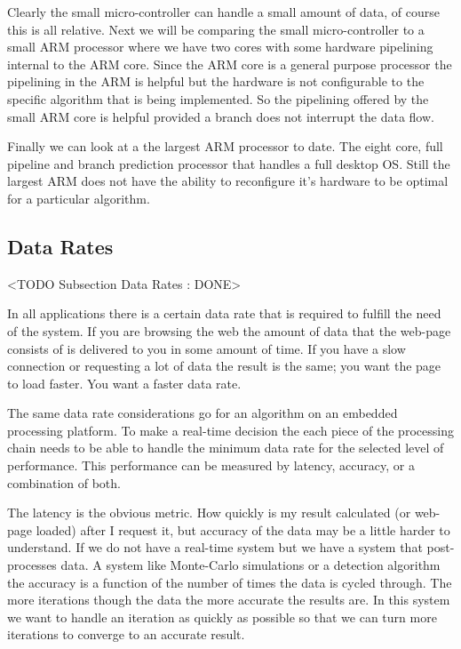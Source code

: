 Clearly the small micro-controller can handle a small amount of data, of course this is all relative. Next we will be comparing the small micro-controller to a small \ac{ARM} processor where we have two cores with some hardware pipelining internal to the \ac{ARM} core. Since the \ac{ARM} core is a general purpose processor the pipelining in the \ac{ARM} is helpful but the hardware is not configurable to the specific algorithm that is being implemented. So the pipelining offered by the small \ac{ARM} core is helpful provided a branch does not interrupt the data flow. 

Finally we can look at a the largest \ac{ARM} processor to date. The eight core, full pipeline and branch prediction processor that handles a full desktop \ac{OS}. Still the largest \ac{ARM} does not have the ability to reconfigure it's hardware to be optimal for a particular algorithm.

\subsection{Data Rates}
	<TODO Subsection Data Rates : DONE>
	
In all applications there is a certain data rate that is required to fulfill the need of the system. If you are browsing the web the amount of data that the web-page consists of is delivered to you in some amount of time. If you have a slow connection or requesting a lot of data the result is the same; you want the page to load faster. You want a faster data rate.

The same data rate considerations go for an algorithm on an embedded processing platform. To make a real-time decision the each piece of the processing chain needs to be able to handle the minimum data rate for the selected level of performance. This performance can be measured by latency, accuracy, or a combination of both. 

The latency is the obvious metric. How quickly is my result calculated (or web-page loaded) after I request it, but accuracy of the data may be a little harder to understand. If we do not have a real-time system but we have a system that post-processes data. A system like Monte-Carlo simulations or a detection algorithm the accuracy is a function of the number of times the data is cycled through. The more iterations though the data the more accurate the results are. In this system we want to handle an iteration as quickly as possible so that we can turn more iterations to converge to an accurate result. 
	
